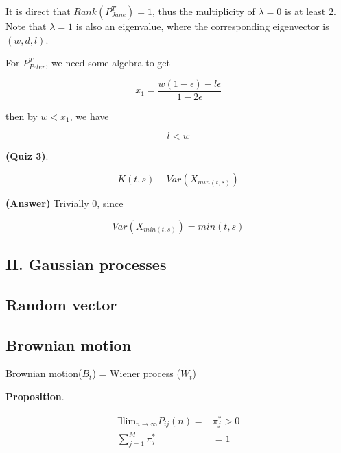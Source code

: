 \documentclass[12pt]{article}
\theoremstyle{nonumberbreak}
\begin{document}
It is direct that $Rank(P_{Jane}^T) = 1$, thus the multiplicity of $\lambda = 0$ is at least $2$. Note that $\lambda =1$ is also an eigenvalue, where the corresponding eigenvector is $(w,d,l)$. 

For $P_{Peter}^T$, we need some algebra to get

$$
x_1 = \frac{w(1-\epsilon) - l\epsilon}{1-2\epsilon}
$$

then by $w < x_1$, we have

$$
l < w
$$



\textbf{(Quiz 3)}. 


$$
K(t,s) - Var(X_{min(t,s)})
$$


\textbf{(Answer)} Trivially $0$, since

$$
Var(X_{min(t,s)}) = min(t,s)
$$





\pagebreak
\begin{center}
\section*{II. Gaussian processes}
\end{center}
\setcounter{section}{2}
\setcounter{subsection}{0}

\subsection{Random vector}



\subsection{Brownian motion}

\begin{center}
Brownian motion($B_t$) = Wiener process ($W_t$)
\end{center}


\begin{theorem}
\textbf{Proposition}. 

$$
\begin{aligned}
\exists \mathrm{lim}_{n\to\infty} P_{ij}(n) =& \pi_j^\ast > 0 \\[8pt]
\sum_{j=1}^M \pi_j^\ast &= 1
\end{aligned}
$$

\end{theorem}
\end{document}
